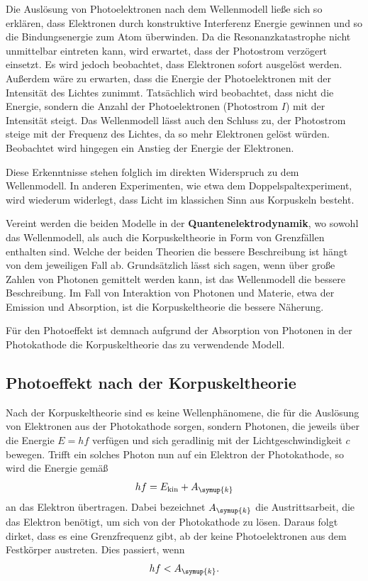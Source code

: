 Die Auslösung von Photoelektronen nach dem Wellenmodell ließe sich so erklären, dass Elektronen durch konstruktive Interferenz Energie
gewinnen und so die Bindungsenergie zum Atom überwinden.
Da die Resonanzkatastrophe nicht unmittelbar eintreten kann, wird erwartet, dass der Photostrom verzögert einsetzt. Es wird jedoch 
beobachtet, dass Elektronen sofort ausgelöst werden.
Außerdem wäre zu erwarten, dass die Energie der Photoelektronen mit der Intensität des Lichtes zunimmt. Tatsächlich wird beobachtet, dass
nicht die Energie, sondern die Anzahl der Photoelektronen (Photostrom $I$) mit der Intensität steigt.
Das Wellenmodell lässt auch den Schluss zu, der Photostrom steige mit der Frequenz des Lichtes, da so mehr Elektronen gelöst würden. 
Beobachtet wird hingegen ein Anstieg der Energie der Elektronen.

Diese Erkenntnisse stehen folglich im direkten Widerspruch zu dem Wellenmodell. In anderen Experimenten, wie etwa dem Doppelspaltexperiment,
wird wiederum widerlegt, dass Licht im klassichen Sinn aus Korpuskeln besteht.

Vereint werden die beiden Modelle in der \textbf{Quantenelektrodynamik}, wo sowohl das Wellenmodell, als auch die Korpuskeltheorie in Form
von Grenzfällen enthalten sind.
Welche der beiden Theorien die bessere Beschreibung ist hängt von dem jeweiligen Fall ab. Grundsätzlich lässt sich sagen, wenn über große Zahlen
von Photonen gemittelt werden kann, ist das Wellenmodell die bessere Beschreibung. Im Fall von Interaktion von Photonen und Materie, etwa
der Emission und Absorption, ist die Korpuskeltheorie die bessere Näherung.

Für den Photoeffekt ist demnach aufgrund der Absorption von Photonen in der Photokathode die Korpuskeltheorie das zu verwendende Modell.

\subsection{Photoeffekt nach der Korpuskeltheorie}
Nach der Korpuskeltheorie sind es keine Wellenphänomene, die für die Auslösung von Elektronen aus der Photokathode sorgen, sondern Photonen, 
die jeweils über die Energie $E=hf$ verfügen und sich geradlinig mit der Lichtgeschwindigkeit $c$ bewegen.
Trifft ein solches Photon nun auf ein Elektron der Photokathode, so wird die Energie gemäß
\begin{equation}
    hf = E_{\text{kin}}+A_{\symup{k}} \label{eq:Energie mit Auslösung}
\end{equation}
an das Elektron übertragen. Dabei bezeichnet $A_{\symup{k}}$ die Austrittsarbeit, die das Elektron benötigt, um sich von der Photokathode zu
lösen.
Daraus folgt dirket, dass es eine Grenzfrequenz gibt, ab der keine Photoelektronen aus dem Festkörper austreten. Dies passiert, wenn
\begin{equation}
    hf < A_{\symup{k}}. \label{eq:Grenzfrequenz}
\end{equation}

